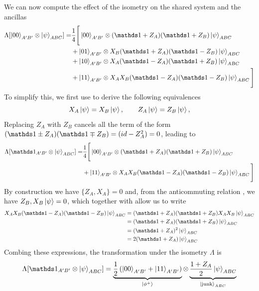 We can now compute the effect of the isometry on the shared system and the ancillas
\begin{equation}
	\begin{split}
		\Lambda[\ket{00}_{A'B'} \otimes \ket{\psi}_{ABC}] = &\frac{1}{4}\Bigg[\ket{00}_{A'B'}\otimes(\id+Z_A)(\id+Z_B)\ket{\psi}_{ABC} \\
													   & + \ket{01}_{A'B'} \otimes X_B(\id+Z_A)(\id-Z_B)\ket{\psi}_{ABC} \\
													   & + \ket{10}_{A'B'} \otimes X_A(\id-Z_A)(\id+Z_B)\ket{\psi}_{ABC} \\
													   & + \ket{11}_{A'B'} \otimes X_AX_B(\id-Z_A)(\id-Z_B)\ket{\psi}_{ABC} \Bigg]
	\end{split}	
\end{equation}
To simplify this, we first use  to derive the following equivalences
\begin{equation}
	X_A \ket{\psi} = X_B \ket{\psi}, \qquad Z_A \ket{\psi} = Z_B \ket{\psi},
	\label{eq:ABMeasEquivalence}
\end{equation}
Replacing $Z_A$ with $Z_B$ cancels all the term of the form $(\id\pm Z_A)(\id\mp Z_B)=(id-Z_A^2)=0$, leading to
\begin{equation}
	\begin{split}
		\Lambda[\id_{A'B'} \otimes \ket{\psi}_{ABC}] = &\frac{1}{4}\Bigg[\ket{00}_{A'B'}\otimes(\id+Z_A)(\id+Z_B)\ket{\psi}_{ABC} \\
													   & + \ket{11}_{A'B'} \otimes X_AX_B(\id-Z_A)(\id-Z_B)\ket{\psi}_{ABC} \Bigg]
	\end{split}	
\end{equation}
By construction we have $\{Z_A,X_A\}=0$ and, from the anticommuting relation , we have ${Z_B,X_B}\ket{\psi}=0$, which together with  allow us to write
\begin{equation}
	\begin{split}
		X_A X_B (\id - Z_A)(\id-Z_B)\ket{\psi}_{ABC} &= (\id + Z_A)(\id +Z_B)X_A X_B \ket{\psi}_{ABC}\\
									 &= (\id + Z_A)(\id + Z_B)\ket{\psi}_{ABC} \\
									 &= (\id + Z_A)^2\ket{\psi}_{ABC} \\
									 &= 2(\id + Z_A)\ket{\psi}_{ABC}
	\end{split}
\end{equation}
Combing these expressions, the transformation under the isometry $\Lambda$ is
\begin{equation}
	\Lambda[ \id_{A'B'} \otimes \ket{\psi}_{ABC} ] = \underbrace{\frac{1}{2}\left( \ket{00}_{A'B'} + \ket{11}_{A'B'} \right)}_{\ket{\phi^+}} \otimes \underbrace{\frac{1+Z_A}{2}\ket{\psi}_{ABC}}_{\ket{\text{junk}}_{ABC}}
	\label{eq:isometry}
\end{equation}

